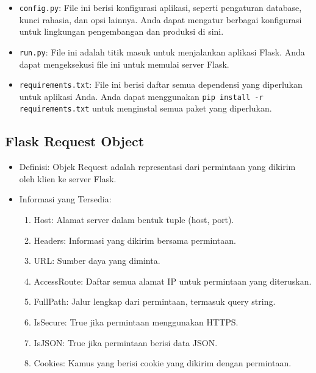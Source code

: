 \documentclass{article}
\begin{document}
\begin{itemize}
\begin{itemize}
\begin{itemize}
                    \end{itemize}
              \item \verb|config.py|: File ini berisi konfigurasi aplikasi, seperti pengaturan database, kunci rahasia, dan opsi lainnya. Anda dapat mengatur berbagai konfigurasi untuk lingkungan pengembangan dan produksi di sini.
              \item \verb|run.py|: File ini adalah titik masuk untuk menjalankan aplikasi Flask. Anda dapat mengeksekusi file ini untuk memulai server Flask.
              \item \verb|requirements.txt|: File ini berisi daftar semua dependensi yang diperlukan untuk aplikasi Anda. Anda dapat menggunakan \verb|pip install -r requirements.txt| untuk menginstal semua paket yang diperlukan.
          \end{itemize}
\end{itemize}

\subsection{Flask Request Object}
\begin{itemize}
    \item Definisi: Objek Request adalah representasi dari permintaan yang dikirim oleh klien ke server Flask.
    \item Informasi yang Tersedia:
          \begin{enumerate}
              \item Host: Alamat server dalam bentuk tuple (host, port).
              \item Headers: Informasi yang dikirim bersama permintaan.
              \item URL: Sumber daya yang diminta.
              \item AccessRoute: Daftar semua alamat IP untuk permintaan yang diteruskan.
              \item FullPath: Jalur lengkap dari permintaan, termasuk query string.
              \item IsSecure: True jika permintaan menggunakan HTTPS.
              \item IsJSON: True jika permintaan berisi data JSON.
              \item Cookies: Kamus yang berisi cookie yang dikirim dengan permintaan.
          \end{enumerate}
\end{itemize}
\end{document}
